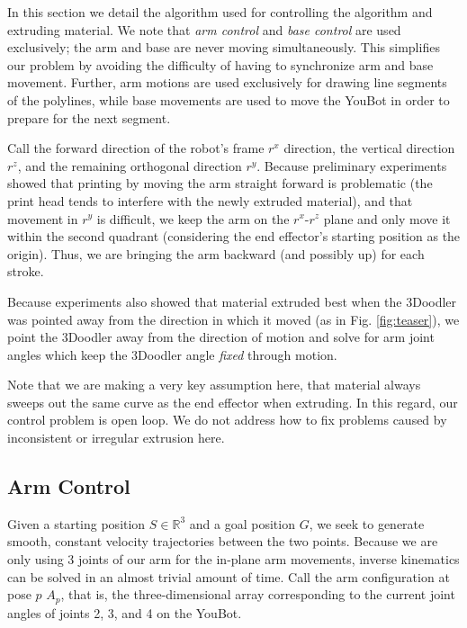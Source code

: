 \documentclass[conference]{acmsiggraph}
\begin{document}
In this section we detail the algorithm used for controlling the algorithm and extruding material.  We note that \emph{arm control} and \emph{base control} are used exclusively; the arm and base are never moving simultaneously.  This simplifies our problem by avoiding the difficulty of having to synchronize arm and base movement.  Further, arm motions are used exclusively for drawing line segments of the polylines, while base movements are used to move the YouBot in order to prepare for the next segment.  

Call the forward direction of the robot's frame $r^x$ direction, the vertical direction $r^z$, and the remaining orthogonal direction $r^y$.  Because preliminary experiments showed that printing by moving the arm straight forward is problematic (the print head tends to interfere with the newly extruded material), and that movement in $r^y$ is difficult, we keep the arm on the $r^x$-$r^z$ plane and only move it within the second quadrant (considering the end effector's starting position as the origin).  Thus, we are bringing the arm backward (and possibly up) for each stroke.

Because experiments also showed that material extruded best when the 3Doodler was pointed away from the direction in which it moved (as in Fig. \ref{fig:teaser}), we point the 3Doodler away from the direction of motion and solve for arm joint angles which keep the 3Doodler angle \emph{fixed} through motion.

Note that we are making a very key assumption here, that material always sweeps out the same curve as the end effector when extruding.  In this regard, our control problem is open loop.  We do not address how to fix problems caused by inconsistent or irregular extrusion here.

\subsection{Arm Control}
Given a starting position $S \in \mathbb{R}^3$ and a goal position $G$, we seek to generate smooth, constant velocity trajectories between the two points.  Because we are only using 3 joints of our arm for the in-plane arm movements, inverse kinematics can be solved in an almost trivial amount of time.  Call the arm configuration at pose $p$ $A_p$, that is, the three-dimensional array corresponding to the current joint angles of joints 2, 3, and 4 on the YouBot.
\end{document}
